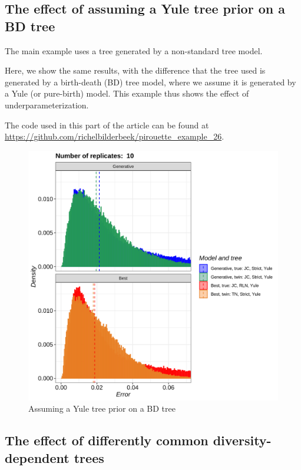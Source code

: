 \subsection{The effect of assuming a Yule tree prior on a BD tree}
\label{subsec:under_parameterization}

The main example uses a tree generated by a non-standard tree model.

Here, we show the same results, with the difference that
the tree used is generated by a birth-death (BD) tree model,
where we assume it is generated by a Yule (or pure-birth) model.
This example thus shows the effect of underparameterization.

The code used in this part of the article can be found at 
\url{https://github.com/richelbilderbeek/pirouette_example_26}.

\begin{figure}[H]
  \includegraphics[width=\textwidth]{pirouette_example_26/errors.png}
  \caption{Assuming a Yule tree prior on a BD tree}
\end{figure}

\subsection{The effect of differently common diversity-dependent trees}
\label{subsec:better_label_needed}

